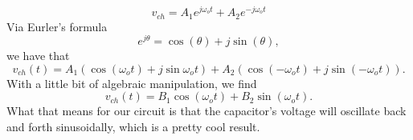 \documentclass[nobib]{tufte-handout}
\begin{document}
\begin{equation}
    v_{ch} = A_1 e^{j\omega_ot} + A_2 e^{-j\omega_ot}
\end{equation}
Via Eurler's formula 
\begin{equation}
    e^{j\theta} = \cos{(\theta)} + j\sin{(\theta)},
\end{equation}
we have that 
\begin{equation}
    v_{ch}(t) = A_1 \left(\cos{(\omega_ot)} + j\sin{\omega_ot}\right)
    + A_2 \left(\cos{(-\omega_ot)} + j\sin{(-\omega_ot)}\right).
\end{equation}
With a little bit of 
algebraic manipulation, we find 
\begin{equation}
    v_{ch}(t) = B_1\cos{(\omega_ot)} + B_2 \sin{(\omega_ot)}.
\end{equation}
What that means for our circuit 
is that the capacitor's voltage will 
oscillate back and forth sinusoidally, 
which is a pretty cool result. 
\end{document}
